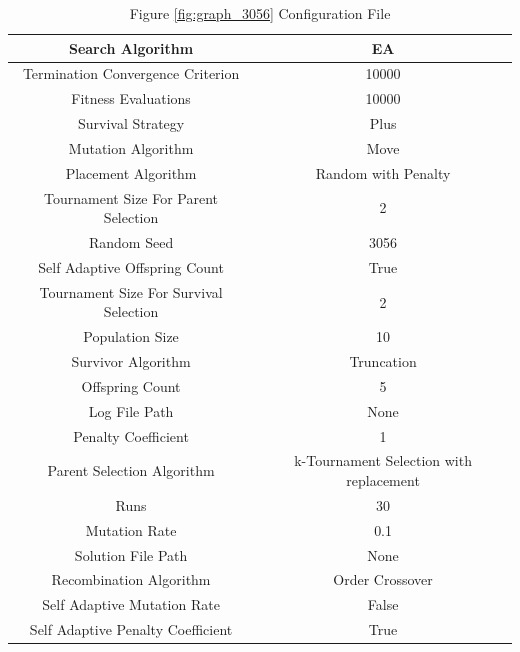 \documentclass{standalone}
\begin{document}
\begin{table}[!htb]
	\centering
	\caption{Figure \ref{fig:graph_3056} Configuration File}
	\label{tab:graph_3056}
	\begin{tabular}{| c | c |}
		\hline
		Search Algorithm		& EA		 \\
		\hline
		Termination Convergence Criterion		& 10000		 \\
		\hline
		Fitness Evaluations		& 10000		 \\
		\hline
		Survival Strategy		& Plus		 \\
		\hline
		Mutation Algorithm		& Move		 \\
		\hline
		Placement Algorithm		& Random with Penalty		 \\
		\hline
		Tournament Size For Parent Selection		& 2		 \\
		\hline
		Random Seed		& 3056		 \\
		\hline
		Self Adaptive Offspring Count		& True		 \\
		\hline
		Tournament Size For Survival Selection		& 2		 \\
		\hline
		Population Size		& 10		 \\
		\hline
		Survivor Algorithm		& Truncation		 \\
		\hline
		Offspring Count		& 5		 \\
		\hline
		Log File Path		& None		 \\
		\hline
		Penalty Coefficient		& 1		 \\
		\hline
		Parent Selection Algorithm		& k-Tournament Selection with replacement		 \\
		\hline
		Runs		& 30		 \\
		\hline
		Mutation Rate		& 0.1		 \\
		\hline
		Solution File Path		& None		 \\
		\hline
		Recombination Algorithm		& Order Crossover		 \\
		\hline
		Self Adaptive Mutation Rate		& False		 \\
		\hline
		Self Adaptive Penalty Coefficient		& True		 \\
		\hline
	\end{tabular}
\end{table}
\end{document}
